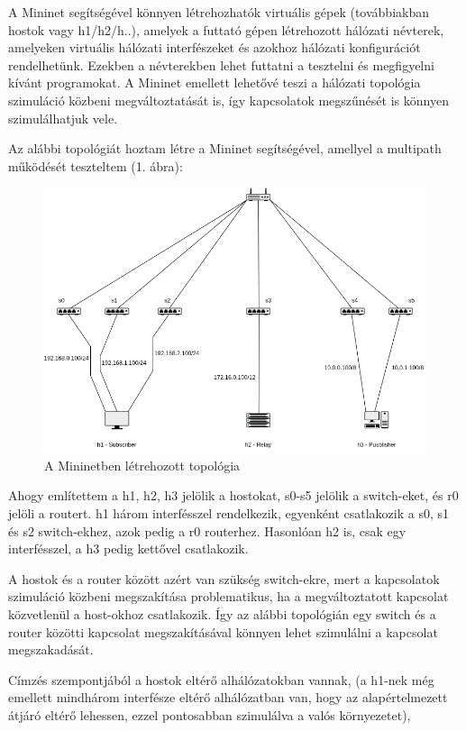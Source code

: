 \documentclass[a4paper,oneside]{article}
\begin{document}
A Mininet segítségével könnyen létrehozhatók virtuális gépek (továbbiakban hostok vagy h1/h2/h..), 
amelyek a futtató gépen létrehozott hálózati névterek, amelyeken virtuális
hálózati interfészeket és azokhoz hálózati konfigurációt rendelhetünk.
Ezekben a névterekben lehet futtatni a tesztelni és megfigyelni kívánt programokat.
A Mininet emellett lehetővé teszi a hálózati topológia 
szimuláció közbeni megváltoztatását is, így kapcsolatok megszűnését 
is könnyen szimulálhatjuk vele. \cite{mininet}

Az alábbi topológiát hoztam létre a Mininet segítségével, amellyel a multipath működését teszteltem (1. ábra):

\begin{figure}[h]
  \centering
    \includegraphics[width=15cm]{topo1}
\caption{A Mininetben létrehozott topológia \cite{drawio}}
\end{figure}
 
Ahogy említettem a h1, h2, h3 jelölik a hostokat, s0-s5 jelölik a switch-eket, és r0 jelöli a routert.
h1 három interfésszel rendelkezik, egyenként csatlakozik a s0, s1 és s2 switch-ekhez, azok pedig a r0 routerhez.
Hasonlóan h2 is, csak egy interfésszel, a h3 pedig kettővel csatlakozik.

A hostok és a router között azért van szükség switch-ekre,
mert a kapcsolatok szimuláció közbeni megszakítása problematikus, ha a megváltoztatott kapcsolat közvetlenül a host-okhoz csatlakozik.
Így az alábbi topológián egy switch és a router közötti kapcsolat megszakításával könnyen lehet szimulálni a kapcsolat megszakadását.

Címzés szempontjából a hostok eltérő alhálózatokban vannak, (a h1-nek még emellett 
mindhárom interfésze eltérő alhálózatban van, hogy az alapértelmezett átjáró eltérő lehessen, ezzel pontosabban szimulálva a valós környezetet),
\end{document}
